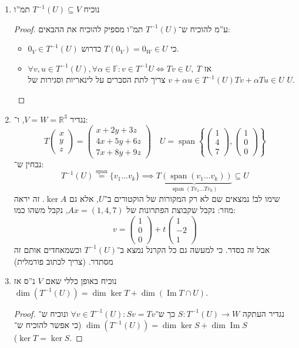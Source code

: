 \documentclass[]{article}
\newcommand\R     {\mathbb{R}}
\DeclareMathOperator\Img   {Im}
\DeclareMathOperator{\Sp}     {span}
\newcommand\F         {\mathbb{F}}
\newcommand\co        {\colon}
\newcommand\pms[1]    {\begin{pmatrix}
		#1
\end{pmatrix}}
\newcommand\ag        {\alpha}
\newcommand\op    {^{-1}}
\newcommand\ccb[1]    {\left \{ #1 \right \}}
\theoremstyle{definition}
\begin{document}
	\begin{enumerate}
		\item נוכיח $T\op(U) \subseteq V$ תמ''ו \begin{proof}
			ע''מ להוכיח ש־$T\op(U)$ תמ''ו מספיק להוכיח את ההבאים: 
			\begin{itemize}
				\item $0_V \in T\op(U)$ כי $T(0_V) = 0_W \in U$ כדרוש. 
				\item $\forall v, u \in T\op(U), \forall \ag \in \F\co v \in T\op U \iff Tv \in U, \ T$ אז $v + \ag u \in T\op(U) Tv + \ag Tu \in U$ צריך לתת הסברים על לינאריות וסגירות של $U$. 
			\end{itemize}
		\end{proof}
		\item נגדיר $V = W = \R^3$, ו־: 
		\[ T\pms{x \\ y \\ z} = \pms{x + 2y + 3z \\ 4x + 5y + 6z \\ 7x + 8y  + 9z} \quad U = \Sp\ccb{\pms{1 \\ 4 \\ 7}, \pms{1 \\ 0 \\ 0}} \]
		נבחין ש־: 
		\[ T\op(U) \overset{\Sp}{=} \{v_1 \dots v_k\} \implies \underbrace{T(\Sp(v_1 \dots v_k))}_{\Sp(Tv_1 \dots Tv_k)} \subseteq U \]
		שימו לב! נמצאים שם לא רק המקורות של הוקטורים ב־$U$, אלא גם $\ker A$. זה יראה מוזר: נקבל שקבוצת הפתרונות של $Ax = (1, 4, 7)$, נקבל משהו כמו: 
		\[ v = \pms{1 \\ 0 \\ 0} + t\pms{1 \\ -2 \\ 1} \]
		אבל זה בסדר. כי למעשה גם כל הקרנל נמצא ב־$T\op(U)$ וכשמאחדים אותם זה מסתדר. 
		(צריך לכתוב פורמלית)
		\item נוכיח באופן כללי שאם $V$ נ''ס אז $\dim (T\op (U)) = \dim \ker T + \dim (\Img T \cap U)$. \begin{proof}
			נגדיר העתקה $S \co T\op(U) \to W$ כך ש־$\forall v \in T\op(U) \co Sv = Tv$ ונוכיח ש־$\dim(T\op(U)) = \dim \ker S + \dim \Img S$ (כי אפשר להוכיח ש־$\ker T = \ker S$). 
		\end{proof}
	\end{enumerate}
	
\end{document}
